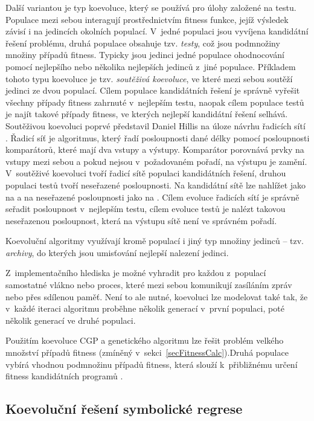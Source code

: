 Další variantou je typ koevoluce, který se používá pro úlohy založené na testu. Populace mezi sebou interagují prostřednictvím fitness funkce, jejíž výsledek závisí i na jedincích okolních populací. V~jedné populaci jsou vyvíjena kandidátní řešení problému, druhá populace obsahuje tzv. \emph{testy}, což jsou podmnožiny množiny případů fitness. Typicky jsou jedinci jedné populace ohodnocování pomocí nejlepšího nebo několika nejlepších jedinců z~jiné populace. Příkladem tohoto typu koevoluce je tzv. \emph{soutěživá koevoluce}, ve které mezi sebou soutěží jedinci ze dvou populací. Cílem populace kandidátních řešení je správně vyřešit všechny případy fitness zahrnuté v~nejlepším testu, naopak cílem populace testů je najít takové případy fitness, ve kterých nejlepší kandidátní řešení selhává. Soutěživou koevoluci poprvé představil Daniel Hillis na úloze návrhu řadicích sítí \cite{Hillis}. Řadicí síť je algoritmus, který řadí posloupnosti dané délky pomocí posloupnosti komparátorů, které mají dva vstupy a výstupy. Komparátor porovnává prvky na vstupy mezi sebou a pokud nejsou v~požadovaném pořadí, na výstupu je zamění. V~soutěživé koevoluci tvoří řadicí sítě populaci kandidátních řešení, druhou populaci testů tvoří neseřazené posloupnosti. Na kandidátní sítě lze nahlížet jako na  a na neseřazené posloupnosti jako na . Cílem evoluce řadicích sítí je správně seřadit posloupnost v~nejlepším testu, cílem evoluce testů je nalézt takovou neseřazenou posloupnost, která na výstupu sítě není ve správném pořadí.

Koevoluční algoritmy využívají kromě populací i jiný typ množiny jedinců -- tzv. \emph{archivy}, do kterých jsou umisťování nejlepší nalezení jedinci.

Z~implementačního hlediska je možné vyhradit pro každou z~populací samostatné vlákno nebo proces, které mezi sebou komunikují zasíláním zpráv nebo přes sdílenou paměť. Není to ale nutné, koevoluci lze modelovat také tak, že v~každé iteraci algoritmu proběhne několik generací v~první populaci, poté několik generací ve druhé populaci.

Použitím koevoluce CGP a genetického algoritmu lze řešit problém velkého množství případů fitness (zmíněný v~sekci~\ref{secFitnessCalc}).Druhá populace vybírá vhodnou podmnožinu případů fitness, která slouží k~přibližnému určení fitness kandidátních programů \cite{SikuPPSN}.


\subsection{Koevoluční řešení symbolické regrese}

